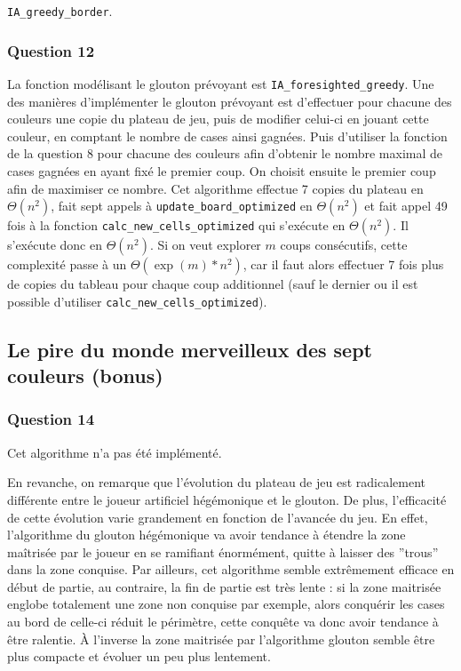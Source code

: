 \documentclass[12pt,a4paper,twoside]{article}
\begin{document}
\texttt{IA\_greedy\_border}.
\subsubsection*{Question 12}
\label{sec:orgheadline21}
La fonction modélisant le glouton prévoyant est
\texttt{IA\_foresighted\_greedy}. 
Une des manières d'implémenter le glouton prévoyant est d'effectuer
pour chacune des couleurs une copie du plateau de jeu, puis de
modifier celui-ci en jouant cette couleur, en comptant le nombre de
cases ainsi gagnées. Puis d'utiliser la fonction de la question 8 pour
chacune des couleurs afin d'obtenir le nombre maximal de cases gagnées
en ayant fixé le premier coup. On choisit ensuite le premier coup afin
de maximiser ce nombre.  Cet algorithme effectue 7 copies du plateau
en \(\Theta(n^{2})\), fait sept appels à \texttt{update\_board\_optimized} en
\(\Theta(n^{2})\) et fait appel 49 fois à la fonction
\texttt{calc\_new\_cells\_optimized} qui s'exécute en \(\Theta(n^{2})\). Il s'exécute
donc en \(\Theta(n^{2})\).
Si on veut explorer \(m\) coups consécutifs, cette complexité passe à un
\(\Theta(\exp(m)*n^{2})\), car il faut alors effectuer 7 fois plus de copies du
tableau pour chaque coup additionnel (sauf le dernier ou il est possible
d'utiliser \texttt{calc\_new\_cells\_optimized}).

\subsection{Le pire du monde merveilleux des sept couleurs (bonus)}
\label{sec:orgheadline24}
\subsubsection*{Question 14}
\label{sec:orgheadline23}
Cet algorithme n'a pas été implémenté. 

En revanche, on remarque que l'évolution du plateau de jeu est
radicalement différente entre le joueur artificiel hégémonique et le
glouton. De plus, l'efficacité de cette évolution varie grandement en
fonction de l'avancée du jeu.  En effet, l'algorithme du glouton
hégémonique va avoir tendance à étendre la zone maîtrisée par le
joueur en se ramifiant énormément, quitte à laisser des ''trous'' dans
la zone conquise. Par ailleurs, cet algorithme semble extrêmement
efficace en début de partie, au contraire, la fin de partie est très
lente : si la zone maitrisée englobe totalement une zone non conquise
par exemple, alors conquérir les cases au bord de celle-ci réduit le
périmètre, cette conquête va donc avoir tendance à être ralentie.  À
l'inverse la zone maitrisée par l'algorithme glouton semble être plus
compacte et évoluer un peu plus lentement.
\end{document}
